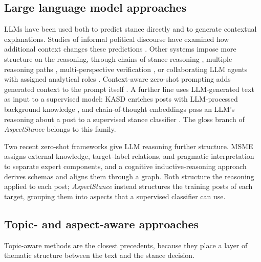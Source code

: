 \documentclass[pdflatex,sn-mathphys-num,iicol]{sn-jnl}%
\begin{document}
\subsection{Large language model approaches}\label{subsec23}
LLMs have been used both to predict stance directly and to generate contextual explanations. Studies of informal political discourse have examined how additional context changes these predictions \cite{gambini2024evaluating,sucu2025exploiting}. Other systems impose more structure on the reasoning, through chains of stance reasoning \cite{ma2024chain}, multiple reasoning paths \cite{zhang2025mprf}, multi-perspective verification \cite{zhang2025mpvstance}, or collaborating LLM agents with assigned analytical roles \cite{lan2024cola}. Context-aware zero-shot prompting adds generated context to the prompt itself \cite{allahgholi2025conspro}. A further line uses LLM-generated text as input to a supervised model: KASD enriches posts with LLM-processed background knowledge \cite{li2023stance}, and chain-of-thought embeddings pass an LLM's reasoning about a post to a supervised stance classifier \cite{gatto2023cot}. The gloss branch of \textit{AspectStance} belongs to this family.

Two recent zero-shot frameworks give LLM reasoning further structure. MSME \cite{zhang2026msme} assigns external knowledge, target--label relations, and pragmatic interpretation to separate expert components, and a cognitive inductive-reasoning approach \cite{zhang2026induce} derives schemas and aligns them through a graph. Both structure the reasoning applied to each post; \textit{AspectStance} instead structures the training posts of each target, grouping them into aspects that a supervised classifier can use.

\subsection{Topic- and aspect-aware approaches}\label{subsec24}
Topic-aware methods are the closest precedents, because they place a layer of thematic structure between the text and the stance decision.
\end{document}
